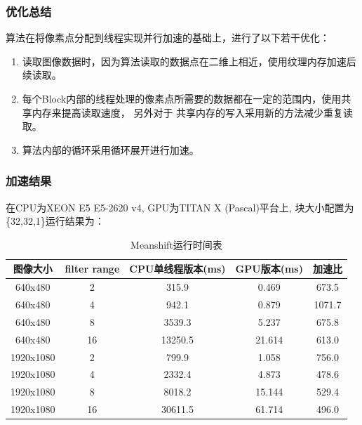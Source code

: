 \documentclass[a4paper, 11pt]{article}
\begin{document}
\subsubsection{优化总结}

算法在将像素点分配到线程实现并行加速的基础上，进行了以下若干优化：

\begin{enumerate}
    \item 读取图像数据时，因为算法读取的数据点在二维上相近，使用纹理内存加速后续读取。
    \item 每个Block内部的线程处理的像素点所需要的数据都在一定的范围内，使用共享内存来提高读取速度，
    另外对于 共享内存的写入采用新的方法减少重复读取。
    \item 算法内部的循环采用循环展开进行加速。
\end{enumerate}

\subsubsection{加速结果}
在CPU为XEON E5 E5-2620 v4, GPU为TITAN X (Pascal)平台上, 块大小配置为\{32,32,1\}运行结果为：

\begin{table}[H]
	\centering
	\begin{tabular}{ccccc}
		\hline
		图像大小   & filter range & CPU单线程版本(ms) & GPU版本(ms) & 加速比 \\ \hline
		640x480   & 2            & 315.9           & 0.469       & 673.5 \\ \hline
		640x480   & 4            & 942.1           & 0.879       & 1071.7\\ \hline
		640x480   & 8            & 3539.3          & 5.237       & 675.8 \\ \hline
		640x480   & 16           & 13250.5         & 21.614      & 613.0 \\ \hline
		1920x1080 & 2            & 799.9           & 1.058       & 756.0 \\ \hline
		1920x1080 & 4            & 2332.4          & 4.873       & 478.6 \\ \hline
		1920x1080 & 8            & 8018.2          & 15.144      & 529.4 \\ \hline
		1920x1080 & 16           & 30611.5         & 61.714      & 496.0 \\ \hline

	\end{tabular}
	\caption{Meanshift运行时间表}
	\label{tb:meanshift}
\end{table}
\end{document}
